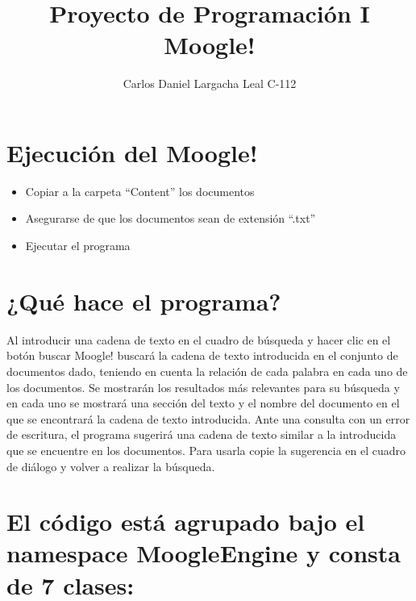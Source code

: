 \documentclass{article}
\begin{document}
\title{\textbf{Proyecto de Programación I \\Moogle!}}
\author{Carlos Daniel Largacha Leal C-112}
\date{}

\maketitle

\vspace{10pt}

\section* {Ejecución del Moogle!}

\begin{itemize}
    \item  Copiar a la carpeta “Content” los documentos
    \item  Asegurarse de que los documentos sean de extensión “.txt”
    \item  Ejecutar el programa
\end{itemize}


\vspace{10pt}

\section* {¿Qué hace el programa?}
Al introducir una cadena de texto en el cuadro de búsqueda y hacer clic en el botón 
buscar Moogle! buscará la cadena de texto introducida en el conjunto de 
documentos dado, teniendo en cuenta la relación de cada palabra en cada uno de 
los documentos. 
Se mostrarán los resultados más relevantes para su búsqueda y en cada uno se 
mostrará una sección del texto y el nombre del documento en el que se encontrará 
la cadena de texto introducida.
Ante una consulta con un error de escritura, el programa sugerirá una cadena de 
texto similar a la introducida que se encuentre en los documentos. Para usarla copie 
la sugerencia en el cuadro de diálogo y volver a realizar la búsqueda. 
\vspace{10pt}

\section* {El código está agrupado bajo el namespace MoogleEngine y 
consta de 7 clases:}
\end{document}
